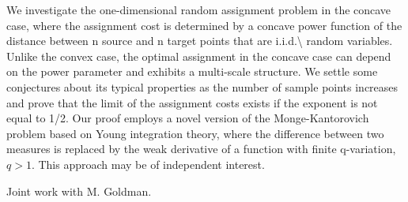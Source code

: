 \mypage
{}
\begin{myabstract}
We investigate the one-dimensional random assignment problem in the
concave case, where the assignment cost is determined by a concave power
function of the distance between n source and n target points that are
i.i.d.\textbackslash{} random variables. Unlike the convex case, the optimal assignment
in the concave case can depend on the power parameter and exhibits a
multi-scale structure. We settle some conjectures about its typical
properties as the number of sample points increases and prove that the
limit of the assignment costs exists if the exponent is not equal to
1/2. Our proof employs a novel version of the Monge-Kantorovich problem
based on Young integration theory, where the difference between two
measures is replaced by the weak derivative of a function with finite
q-variation, \protect $q>1$. This approach may be of independent interest. 

Joint
work with M. Goldman.
\end{myabstract}
